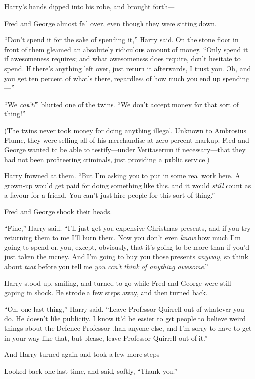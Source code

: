 Harry’s hands dipped into his robe, and brought forth—

Fred and George almost fell over, even though they were sitting down.

“Don’t spend it for the sake of spending it,” Harry said. On the stone floor in front of them gleamed an absolutely ridiculous amount of money. “Only spend it if awesomeness requires; and what awesomeness does require, don’t hesitate to spend. If there’s anything left over, just return it afterwards, I trust you. Oh, and you get ten percent of what’s there, regardless of how much you end up spending—”

“We \emph{can’t!}” blurted one of the twins. “We don’t accept money for that sort of thing!”

(The twins never took money for doing anything illegal. Unknown to Ambrosius Flume, they were selling all of his merchandise at zero percent markup. Fred and George wanted to be able to testify—under Veritaserum if necessary—that they had not been profiteering criminals, just providing a public service.)

Harry frowned at them. “But I’m asking you to put in some real work here. A grown-up would get paid for doing something like this, and it would \emph{still} count as a favour for a friend. You can’t just hire people for this sort of thing.”

Fred and George shook their heads.

“Fine,” Harry said. “I’ll just get you expensive Christmas presents, and if you try returning them to me I’ll burn them. Now you don’t even \emph{know} how much I’m going to spend on you, except, obviously, that it’s going to be more than if you’d just taken the money. And I’m going to buy you those presents \emph{anyway,} so think about \emph{that} before you tell me \emph{you can’t think of anything awesome}.”

Harry stood up, smiling, and turned to go while Fred and George were still gaping in shock. He strode a few steps away, and then turned back.

“Oh, one last thing,” Harry said. “Leave Professor Quirrell out of whatever you do. He doesn’t like publicity. I know it’d be easier to get people to believe weird things about the Defence Professor than anyone else, and I’m sorry to have to get in your way like that, but please, leave Professor Quirrell out of it.”

And Harry turned again and took a few more steps—

Looked back one last time, and said, softly, “Thank you.”

